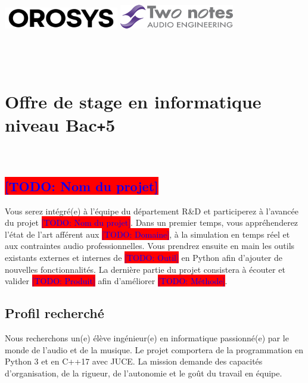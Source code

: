 \documentclass[12pt, a4paper]{article}
\newcommand\todo[1]{\colorbox{red}{\textcolor{blue}{[TODO: #1]}}} %
\begin{document}
\thispagestyle{empty}               %
\begin{center}
    \includegraphics[width=5cm]{../img/logo_orosys.png} \hspace{1cm} \includegraphics[width=5cm]{../img/logo_twonotes.png} ~\\~\\~\\~\\
    \section*{Offre de stage en informatique niveau Bac\texttt{+}5}
\end{center}

~\\

\subsection*{\todo{Nom du projet}}

Vous serez intégré(e) à l'équipe du département R\&D et participerez à l'avancée du projet \todo{Nom du projet}.
Dans un premier temps, vous appréhenderez l'état de l'art afférent aux \todo{Domaine}, à la simulation en temps réel et aux contraintes audio professionnelles.
Vous prendrez ensuite en main les outils existants externes et internes de \todo{Outil} en Python afin d'ajouter de nouvelles fonctionnalités.
La dernière partie du projet consistera à écouter et valider \todo{Produit} afin d'améliorer \todo{Méthode}.

\subsection*{Profil recherché}

Nous recherchons un(e) élève ingénieur(e) en informatique passionné(e) par le monde de l'audio et de la musique.
Le projet comportera de la programmation en Python 3 et en C++17 avec JUCE.
La mission demande des capacités d'organisation, de la rigueur, de l'autonomie et le goût du travail en équipe.
\end{document}
